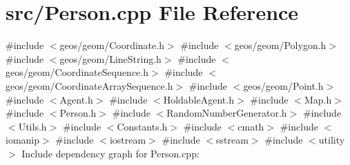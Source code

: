 \section{src/\+Person.cpp File Reference}
\label{_person_8cpp}
{\ttfamily \#include $<$geos/geom/\+Coordinate.\+h$>$}\newline
{\ttfamily \#include $<$geos/geom/\+Polygon.\+h$>$}\newline
{\ttfamily \#include $<$geos/geom/\+Line\+String.\+h$>$}\newline
{\ttfamily \#include $<$geos/geom/\+Coordinate\+Sequence.\+h$>$}\newline
{\ttfamily \#include $<$geos/geom/\+Coordinate\+Array\+Sequence.\+h$>$}\newline
{\ttfamily \#include $<$geos/geom/\+Point.\+h$>$}\newline
{\ttfamily \#include $<$Agent.\+h$>$}\newline
{\ttfamily \#include $<$Holdable\+Agent.\+h$>$}\newline
{\ttfamily \#include $<$Map.\+h$>$}\newline
{\ttfamily \#include $<$Person.\+h$>$}\newline
{\ttfamily \#include $<$Random\+Number\+Generator.\+h$>$}\newline
{\ttfamily \#include $<$Utils.\+h$>$}\newline
{\ttfamily \#include $<$Constants.\+h$>$}\newline
{\ttfamily \#include $<$cmath$>$}\newline
{\ttfamily \#include $<$iomanip$>$}\newline
{\ttfamily \#include $<$iostream$>$}\newline
{\ttfamily \#include $<$sstream$>$}\newline
{\ttfamily \#include $<$utility$>$}\newline
Include dependency graph for Person.\+cpp\+:
